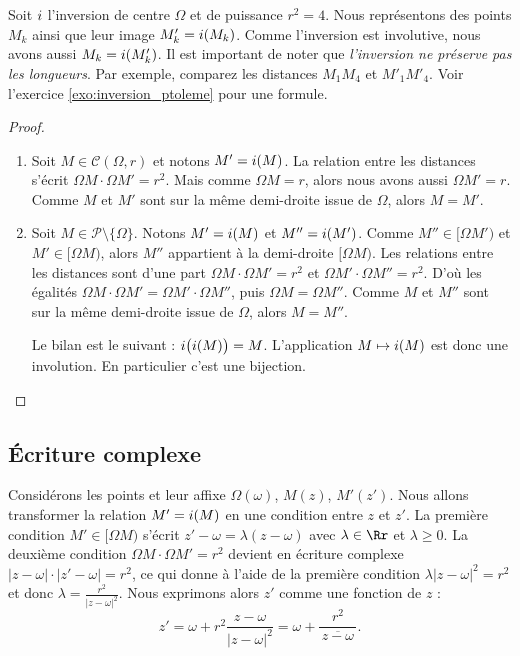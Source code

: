 \documentclass[11pt,class=report,crop=false]{standalone}
\begin{document}
\begin{exemple}
Soit $i$ l'inversion de centre $\Omega$ et de puissance $r^2=4$. 
Nous représentons des points $M_k$ ainsi que leur image $M'_k=i(M_k)$.
Comme l'inversion est involutive, nous avons aussi $M_k=i(M'_k)$.
Il est important de noter que \emph{l'inversion ne préserve pas les longueurs}.
Par exemple, comparez les distances $M_1M_4$ et $M'_1 M'_4$.
Voir l'exercice \ref{exo:inversion_ptoleme} pour une formule.
\end{exemple}

\begin{proof}~
\begin{enumerate}
  \item Soit $M \in \mathcal{C}(\Omega,r)$ et notons $M' = i(M)$.
  La relation entre les distances s'écrit $\Omega M \cdot \Omega M' = r^2$.
  Mais comme $\Omega M=r$, alors nous avons aussi $\Omega M' = r$. Comme $M$ et $M'$
  sont sur la même demi-droite issue de $\Omega$, alors $M=M'$.
  
  \item Soit $M \in \mathcal{P} \setminus \{\Omega\}$. Notons $M' = i(M)$ et $M'' = i(M')$.
  Comme $M'' \in [\Omega M')$ et $M' \in [\Omega M)$, alors $M''$ appartient à la demi-droite $[\Omega M)$.
  Les relations entre les distances sont d'une part $\Omega M \cdot \Omega M' = r^2$
  et $\Omega M' \cdot \Omega M'' = r^2$. D'où les égalités $\Omega M \cdot \Omega M' = \Omega M' \cdot \Omega M''$,
  puis $\Omega M=\Omega M''$. Comme $M$ et $M''$ sont sur la même demi-droite issue de $\Omega$, alors $M=M''$.
  
  Le bilan est le suivant : $i\big(i(M)\big) = M$. L'application $M \mapsto i(M)$ est donc une involution.
  En particulier c'est une bijection.
\end{enumerate}
\end{proof}

\subsection{\'Ecriture complexe}

Considérons les points et leur affixe $\Omega(\omega)$, $M(z)$, $M'(z')$.
Nous allons transformer la relation $M'= i (M)$ en une condition entre $z$ et $z'$.
La première condition $M' \in [\Omega M)$ s'écrit $z'-\omega= \lambda(z-\omega)$ avec $\lambda \in \Rr$ 
et $\lambda \ge 0$.
La deuxième condition $\Omega M \cdot \Omega M' = r^2$ devient en écriture complexe 
$|z-\omega|\cdot|z'-\omega| = r^2$, ce qui donne à l'aide de la première condition
$\lambda |z-\omega|^2 = r^2$ et donc $\lambda = \frac{r^2}{|z-\omega|^2}$.
Nous exprimons alors $z'$ comme une fonction de $z$ :
$$z'= \omega + r^2 \frac{z-\omega}{|z-\omega|^2} = \omega + \frac{r^2}{\,\overline{z-\omega}\,}.$$
\end{document}
